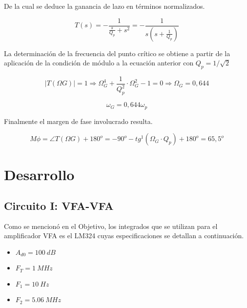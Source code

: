 \documentclass[12pt,A4paper,titlepage]{article}
\begin{document}
\bigskip
\hspace{1mm} De la cual se deduce la ganancia de lazo en términos normalizados.

\begin{equation}
    T(s) = - \frac{1}{\frac{s}{Q_p} + s^2} = - \frac{1}{s (s + \frac{1}{Q_p})}
\end{equation}

\bigskip
\hspace{1mm} La determinación de la frecuencia del punto crítico se obtiene a partir de la aplicación de la condición de módulo a la ecuación anterior con \( Q_p = 1/\sqrt{2} \)

\begin{equation}
    |T(\Omega G)| = 1 \Longrightarrow \Omega _G ^4 + \frac{1}{Q_p^2} \cdot \Omega_G^2 - 1 = 0 \Longrightarrow \Omega _G = 0,644
\end{equation}

\begin{equation}
    \omega _G = 0,644 \omega _p
\end{equation}

\bigskip
\hspace{1mm} Finalmente el margen de fase involucrado resulta.

\begin{equation}
    M \phi = \angle T(\Omega G) + 180 ^o = -90^o - tg^1 ( \Omega _G \cdot Q_p) + 180^o = 65,5^o 
\end{equation}





\newpage
\section{Desarrollo}
\subsection{Circuito I: VFA-VFA}
\hspace{1mm} Como se mencionó en el Objetivo, los integrados que se utilizan para el amplificador VFA es el LM324 cuyas especificaciones se detallan a continuación.

\begin{itemize}[itemsep=1pt]
    \item \(A_{d0}=100~dB\)
    \item \(F_T=1~MHz\)
    \item \(F_1=10~Hz\)
    \item \(F_2=5.06~MHz\)
\end{itemize}
\end{document}

